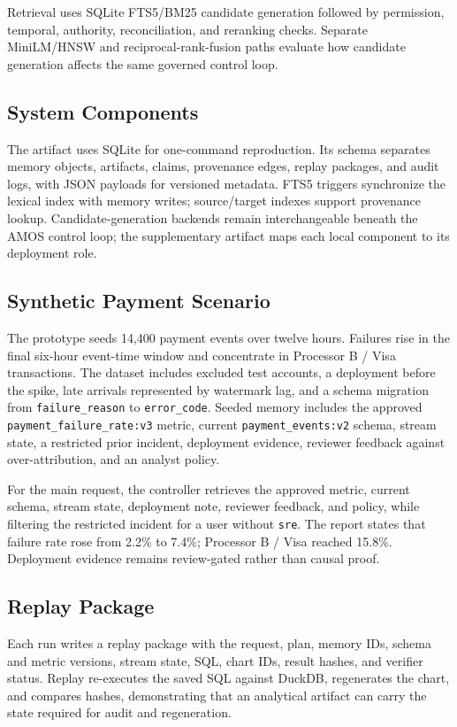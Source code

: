 \documentclass[sigconf,nonacm]{acmart}
\newcommand{\amos}{\textsc{AMOS}\xspace}
\newcommand{\code}[1]{\texttt{#1}}
\begin{document}
Retrieval uses SQLite FTS5/BM25 candidate generation followed by permission, temporal, authority, reconciliation, and reranking checks. Separate MiniLM/HNSW and reciprocal-rank-fusion paths evaluate how candidate generation affects the same governed control loop.

\subsection{System Components}
The artifact uses SQLite for one-command reproduction. Its schema separates memory objects, artifacts, claims, provenance edges, replay packages, and audit logs, with JSON payloads for versioned metadata. FTS5 triggers synchronize the lexical index with memory writes; source/target indexes support provenance lookup. Candidate-generation backends remain interchangeable beneath the \amos control loop; the supplementary artifact maps each local component to its deployment role.

\subsection{Synthetic Payment Scenario}
The prototype seeds 14{,}400 payment events over twelve hours. Failures rise in the final six-hour event-time window and concentrate in Processor B / Visa transactions. The dataset includes excluded test accounts, a deployment before the spike, late arrivals represented by watermark lag, and a schema migration from \code{failure\_reason} to \code{error\_code}. Seeded memory includes the approved \code{payment\_failure\_rate:v3} metric, current \code{payment\_events:v2} schema, stream state, a restricted prior incident, deployment evidence, reviewer feedback against over-attribution, and an analyst policy.

For the main request, the controller retrieves the approved metric, current schema, stream state, deployment note, reviewer feedback, and policy, while filtering the restricted incident for a user without \code{sre}. The report states that failure rate rose from 2.2\% to 7.4\%; Processor B / Visa reached 15.8\%. Deployment evidence remains review-gated rather than causal proof.

\subsection{Replay Package}
Each run writes a replay package with the request, plan, memory IDs, schema and metric versions, stream state, SQL, chart IDs, result hashes, and verifier status. Replay re-executes the saved SQL against DuckDB, regenerates the chart, and compares hashes, demonstrating that an analytical artifact can carry the state required for audit and regeneration.
\end{document}
